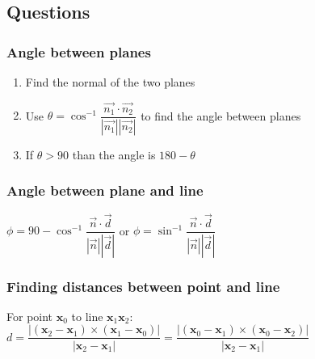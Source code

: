 \subsection{Questions}
\subsubsection{Angle between planes}
\begin{enumerate}
	\item Find the normal of the two planes
	\item Use $\theta = \cos^{-1}\dfrac{\vec{n_1}\cdot\vec{n_2}}{|\vec{n_1}||\vec{n_2}|}$ to find the angle between planes
	\item If $\theta>90$ than the angle is $180-\theta$
\end{enumerate}
\subsubsection{Angle between plane and line}
$\phi = 90-\cos^{-1}\dfrac{\vec{n}\cdot\vec{d}}{|\vec{n}||\vec{d}|}$ or $\phi =\sin^{-1}\dfrac{\vec{n}\cdot\vec{d}}{|\vec{n}||\vec{d}|}$
\subsubsection{Finding distances between point and line}
For point $\textbf{x}_0$ to line $\textbf{x}_1\textbf{x}_2$: $d=\dfrac{|(\textbf{x}_2-\textbf{x}_1)\times(\textbf{x}_1-\textbf{x}_0)|}{|\textbf{x}_2-\textbf{x}_1|}=\dfrac{|(\textbf{x}_0-\textbf{x}_1)\times(\textbf{x}_0-\textbf{x}_2)|}{|\textbf{x}_2-\textbf{x}_1|}$





